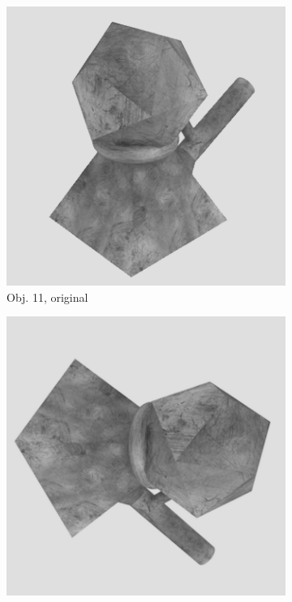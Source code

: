 \begin{figure}
\medskip
\begin{subfigure}{0.2\textwidth}
\includegraphics[width=\linewidth]{Bilder/Objekt11A.png}
\caption{Obj. 11, original} \label{fig:c}
\end{subfigure}\hspace{.5cm} %
\begin{subfigure}{0.2\textwidth}
\includegraphics[width=\linewidth]{Bilder/Objekt11B.png}

\end{subfigure}
\end{figure}
